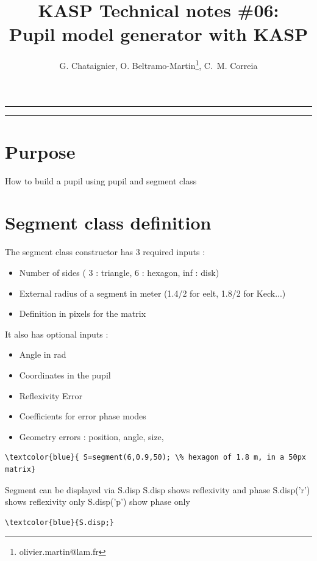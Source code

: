 \documentclass[12pt]{article}
\title{KASP Technical notes \#06:\\ Pupil model generator with KASP}
\author{G. Chataignier, O. Beltramo-Martin\footnote{olivier.martin@lam.fr}, C.~M. Correia}
\date{}
\begin{document}
	
\maketitle	
\rule{\columnwidth}{0.1mm}
\tableofcontents
\rule{\columnwidth}{0.1mm}

\section{Purpose}
	
	
How to build a pupil using pupil and segment class


\section{Segment class definition}

\begin{par}
The segment class constructor has 3 required inputs :
\end{par} \vspace{1em}
\begin{itemize}
\setlength{\itemsep}{-1ex}
   \item Number of sides ( 3 : triangle, 6 : hexagon, inf : disk)
   \item External radius of a segment in meter (1.4/2 for eelt, 1.8/2 for Keck...)
   \item Definition in pixels for the matrix
\end{itemize}
\begin{par}
It also has optional inputs :
\end{par} \vspace{1em}
\begin{itemize}
\setlength{\itemsep}{-1ex}
   \item Angle in rad
   \item Coordinates in the pupil
   \item Reflexivity Error
   \item Coefficients for error phase modes
   \item Geometry errors : position, angle, size,
\end{itemize}
\begin{Verbatim}[commandchars=\\\{\}]
\textcolor{blue}{ S=segment(6,0.9,50); \% hexagon of 1.8 m, in a 50px matrix}
\end{Verbatim}
\begin{par}
Segment can be displayed via S.disp S.disp shows reflexivity and phase S.disp('r') shows reflexivity only S.disp('p') show phase only
\end{par} \vspace{1em}
\begin{Verbatim}[commandchars=\\\{\}]
\textcolor{blue}{S.disp;}
\end{Verbatim}
\end{document}
